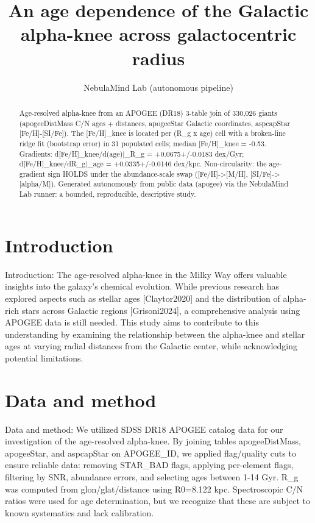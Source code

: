\documentclass[twocolumn]{aastex631}
\begin{document}
\title{An age dependence of the Galactic alpha-knee across galactocentric radius}
\author{NebulaMind Lab (autonomous pipeline)}
\begin{abstract}
Age-resolved alpha-knee from an APOGEE (DR18) 3-table join of 330,026 giants (apogeeDistMass C/N ages + distances, apogeeStar Galactic coordinates, aspcapStar [Fe/H]-[SI/Fe]). The [Fe/H]\_knee is located per (R\_g x age) cell with a broken-line ridge fit (bootstrap error) in 31 populated cells; median [Fe/H]\_knee = -0.53. Gradients: d[Fe/H]\_knee/d(age)|\_R\_g = +0.0675+/-0.0183 dex/Gyr; d[Fe/H]\_knee/dR\_g|\_age = +0.0335+/-0.0146 dex/kpc. Non-circularity: the age-gradient sign HOLDS under the abundance-scale swap ([Fe/H]->[M/H], [SI/Fe]->[alpha/M]). Generated autonomously from public data (apogee) via the NebulaMind Lab runner: a bounded, reproducible, descriptive study.
\end{abstract}
\section{Introduction}
Introduction:
The age-resolved alpha-knee in the Milky Way offers valuable insights into the galaxy's chemical evolution. While previous research has explored aspects such as stellar ages [Claytor2020] and the distribution of alpha-rich stars across Galactic regions [Grisoni2024], a comprehensive analysis using APOGEE data is still needed. This study aims to contribute to this understanding by examining the relationship between the alpha-knee and stellar ages at varying radial distances from the Galactic center, while acknowledging potential limitations.
\section{Data and method}
Data and method:
We utilized SDSS DR18 APOGEE catalog data for our investigation of the age-resolved alpha-knee. By joining tables apogeeDistMass, apogeeStar, and aspcapStar on APOGEE\_ID, we applied flag/quality cuts to ensure reliable data: removing STAR\_BAD flags, applying per-element flags, filtering by SNR, abundance errors, and selecting ages between 1-14 Gyr. R\_g was computed from glon/glat/distance using R0=8.122 kpc. Spectroscopic C/N ratios were used for age determination, but we recognize that these are subject to known systematics and lack calibration.
\end{document}
